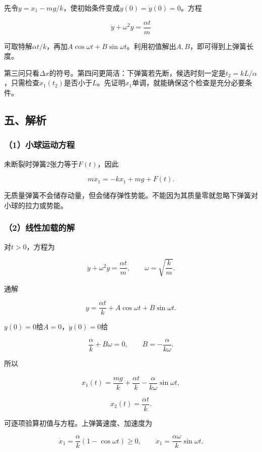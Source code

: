 \documentclass[12pt,a4paper,fontset=fandol]{ctexart}
\begin{document}
先令\(y=x_1-mg/k\)，使初始条件变成\(y(0)=\dot y(0)=0\)。方程

\[
\ddot y+\omega^2y=\frac{\alpha t}{m}
\]

可取特解\(\alpha t/k\)，再加\(A\cos\omega t+B\sin\omega t\)。利用初值解出\(A,B\)，即可得到上弹簧长度。

第三问只看\(\Delta x\)的符号。第四问更简洁：下弹簧若先断，候选时刻一定是\(t_2=kL/\alpha\)，只需检查\(x_1(t_2)\)是否小于\(L\)。先证明\(x_1\)单调，就能确保这个检查是充分必要条件。

\subsection{五、解析}\label{ux4e94ux89e3ux6790-4}

\subsubsection{（1）小球运动方程}\label{ux5c0fux7403ux8fd0ux52a8ux65b9ux7a0b}

未断裂时弹簧2张力等于\(F(t)\)，因此

\[
\boxed{m\ddot x_1=-kx_1+mg+F(t)}.
\]

无质量弹簧不会储存动量，但会储存弹性势能。不能因为其质量零就忽略下弹簧对小球的拉力或势能。

\subsubsection{（2）线性加载的解}\label{ux7ebfux6027ux52a0ux8f7dux7684ux89e3}

对\(t>0\)，方程为

\[
\ddot y+\omega^2y=\frac{\alpha t}{m},
\qquad \omega=\sqrt{\frac km}.
\]

通解

\[
y=\frac{\alpha t}{k}+A\cos\omega t+B\sin\omega t.
\]

\(y(0)=0\)给\(A=0\)，\(\dot y(0)=0\)给

\[
\frac\alpha k+B\omega=0,
\qquad B=-\frac{\alpha}{k\omega}.
\]

所以

\[
\boxed{x_1(t)=\frac{mg}k+\frac{\alpha t}k
-\frac{\alpha}{k\omega}\sin\omega t},
\]

\[
\boxed{x_2(t)=\frac{\alpha t}k}.
\]

可逐项验算初值与方程。上弹簧速度、加速度为

\[
\dot x_1=\frac\alpha k(1-\cos\omega t)\geq0,
\qquad
\ddot x_1=\frac{\alpha\omega}k\sin\omega t.
\]
\end{document}
